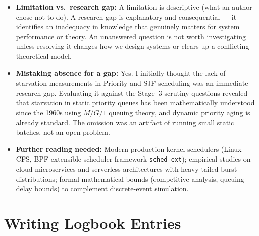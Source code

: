 \documentclass[11pt, a4paper]{article}
\begin{document}
\begin{itemize}[nosep]
    \item \textbf{Limitation vs.\ research gap:} A limitation is descriptive (what an author chose not to do). A research gap is explanatory and consequential --- it identifies an inadequacy in knowledge that genuinely matters for system performance or theory. An unanswered question is not worth investigating unless resolving it changes how we design systems or clears up a conflicting theoretical model.

    \item \textbf{Mistaking absence for a gap:} Yes. I initially thought the lack of starvation measurements in Priority and SJF scheduling was an immediate research gap. Evaluating it against the Stage~3 scrutiny questions revealed that starvation in static priority queues has been mathematically understood since the 1960s using $M/G/1$ queuing theory, and dynamic priority aging is already standard. The omission was an artifact of running small static batches, not an open problem.

    \item \textbf{Further reading needed:} Modern production kernel schedulers (Linux CFS, BPF extensible scheduler framework \texttt{sched\_ext}); empirical studies on cloud microservices and serverless architectures with heavy-tailed burst distributions; formal mathematical bounds (competitive analysis, queuing delay bounds) to complement discrete-event simulation.
\end{itemize}

\section{Writing Logbook Entries}
\end{document}
